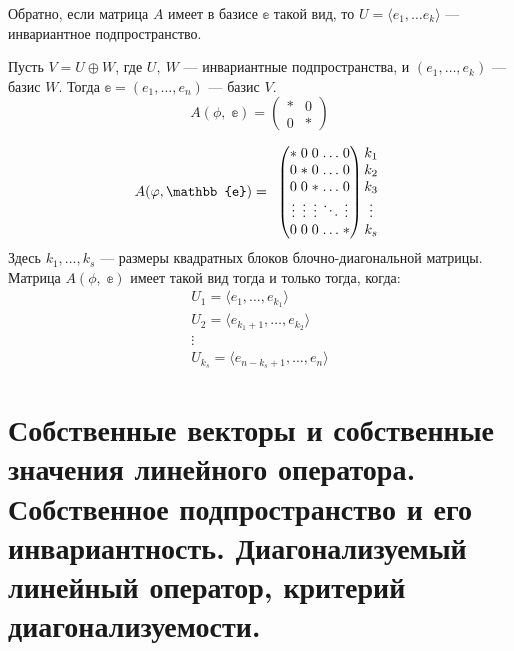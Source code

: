 Обратно, если матрица $A$ имеет в базисе $\mathbb{e}$ такой вид, то $U = \langle e_1, \ldots e_k\rangle$ --- инвариантное подпространство. 

\begin{Generalization}
    Пусть $V = U \oplus W$, где $U,\ W$ --- инвариантные подпространства, и $(e_1, \ldots, e_k)$ --- базис $W$. Тогда $\mathbb{e} = (e_1, \dots, e_n)$ --- базис $V$.
    \[  
        A(\phi,\; \mathbb{e}) = \begin{pmatrix}
            *& 0 \\
            0& *
        \end{pmatrix}
    \]
\end{Generalization}

\begin{Generalization}
  \[
  A(\phi, \mathbb{e}) = 
  \begin{array}{cc}
  \arraycolsep=1.4pt
  \begin{pmatrix}
  * &0 &0 &\ldots &0\\
  0 &* &0 &\ldots &0 \\
  0 &0 &* &\ldots &0 \\
  \vdots &\vdots &\vdots &\ddots &\vdots\\
  0 &0 &0 &\ldots &*
  \end{pmatrix}
  \begin{matrix}
  k_1 \\ k_2 \\ k_3 \\ \vdots \\ k_s
  \end{matrix}
  \end{array}\]
  Здесь $k_1, \ldots, k_s$ --- размеры квадратных блоков блочно-диагональной матрицы. Матрица $A(\phi,\; \mathbb{e})$ имеет такой вид тогда и только тогда, когда:
  \begin{gather*}
      U_1 = \langle e_1, \ldots, e_{k_1}\rangle \\
      U_2 = \langle e_{k_1+1}, \ldots, e_{k_2} \rangle \\
      \vdots\\
      U_{k_s} = \langle e_{n-k_s+1}, \ldots, e_n \rangle
  \end{gather*}
\end{Generalization}

\section{Собственные векторы и собственные значения линейного оператора. Собственное подпространство и его инвариантность. Диагонализуемый линейный оператор, критерий диагонализуемости.}

